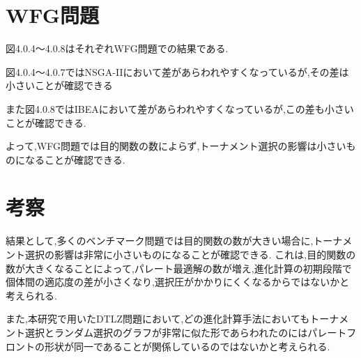 \documentclass[12pt,a4j,notitlepage]{jreport}
\begin{document}
\vspace{+2mm}
\section*{WFG問題}
図4.0.4〜4.0.8はそれぞれWFG問題での結果である.

図4.0.4〜4.0.7ではNSGA-IIにおいて差があらわれやすくなっているが,その差は小さいことが確認できる

また図4.0.8ではIBEAにおいて差があらわれやすくなっているが,この差も小さいことが確認できる.

よって,WFG問題では目的関数の数によらず,トーナメント選択の影響は小さいものになることが確認できる.

\section*{考察}
結果として,多くのベンチマーク問題では目的関数の数が大きい場合に,トーナメント選択の影響は非常に小さいものになることが確認できる.
これは,目的関数の数が大きくなることによって,パレート最適解の数が増え,進化計算の初期段階で個体間の適応度の差が小さくなり,選択圧がかかりにくくなるからではないかと考えられる.

また,本研究で用いたDTLZ問題において,どの進化計算手法においてもトーナメント選択とランダム選択のグラフが非常に似た形であらわれたのにはパレートフロントの形状が同一であることが関係しているのではないかと考えられる.
\end{document}

